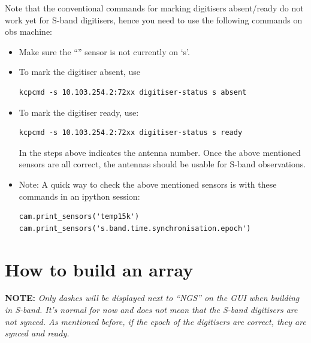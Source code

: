 Note that the conventional commands for marking digitisers absent/ready do not work yet for S-band digitisers, hence you need to use the following commands on obs machine:
\begin{itemize}
	 
\item Make sure the “” sensor is not currently on ‘s’.
\item To mark the digitiser absent, use
\begin{lstlisting}[style=DOS]
kcpcmd -s 10.103.254.2:72xx digitiser-status s absent
\end{lstlisting}


\item To mark the digitiser ready, use:
\begin{lstlisting}[style=DOS]
kcpcmd -s 10.103.254.2:72xx digitiser-status s ready 
\end{lstlisting}


In the steps above  indicates the antenna number. Once the above mentioned sensors are all correct, the antennas should be usable for S-band observations. 

\item Note: A quick way to check the above mentioned sensors is with these commands in an ipython session:
\begin{lstlisting}[style=DOS]
cam.print_sensors('temp15k')
cam.print_sensors('s.band.time.synchronisation.epoch')
\end{lstlisting}
\end{itemize}

\section{ How to build an array}
\textbf{NOTE:} \textit{Only dashes will be displayed next to “NGS” on the GUI when building in S-band. It’s normal for now and does not mean that the S-band digitisers are not synced. As mentioned before, if the epoch of the digitisers are correct, they are synced and ready.}\\

